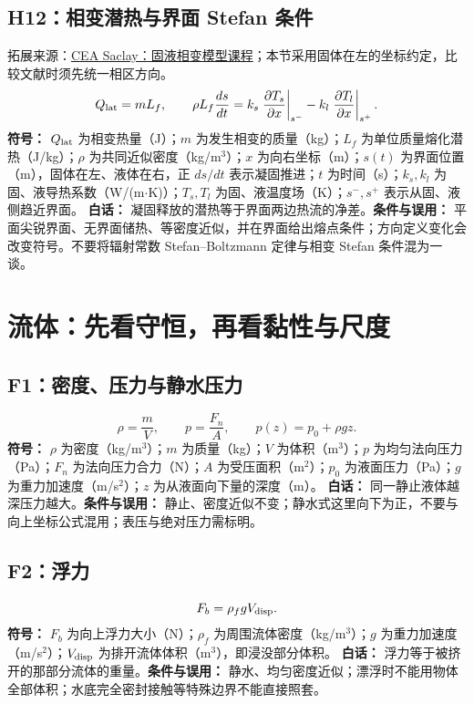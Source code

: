 \documentclass[UTF8,zihao=-4,openany,oneside,fontset=windows]{ctexbook}
\begin{document}
\subsection{H12：相变潜热与界面 Stefan 条件}
拓展来源：\href{https://cea-lbm-saclay.github.io/LBM_Saclay_Documentation/src_doc/05_COURSES/Thermo-PhaseTransition/Phase_Change_Models.html}{CEA Saclay：固液相变模型课程}；本节采用固体在左的坐标约定，比较文献时须先统一相区方向。
\begin{equation}
Q_{\rm lat}=mL_f,\qquad \rho L_f\frac{ds}{dt}=k_s\left.\frac{\partial T_s}{\partial x}\right|_{s^-}-k_l\left.\frac{\partial T_l}{\partial x}\right|_{s^+}.
\end{equation}
\textbf{符号：} $Q_{\rm lat}$ 为相变热量（J）；$m$ 为发生相变的质量（kg）；$L_f$ 为单位质量熔化潜热（J/kg）；$\rho$ 为共同近似密度（kg/m$^3$）；$x$ 为向右坐标（m）；$s(t)$ 为界面位置（m），固体在左、液体在右，正 $ds/dt$ 表示凝固推进；$t$ 为时间（s）；$k_s,k_l$ 为固、液导热系数（W/(m$\cdot$K)）；$T_s,T_l$ 为固、液温度场（K）；$s^-,s^+$ 表示从固、液侧趋近界面。
\textbf{白话：} 凝固释放的潜热等于界面两边热流的净差。\textbf{条件与误用：} 平面尖锐界面、无界面储热、等密度近似，并在界面给出熔点条件；方向定义变化会改变符号。不要将辐射常数 Stefan--Boltzmann 定律与相变 Stefan 条件混为一谈。

\section{流体：先看守恒，再看黏性与尺度}
\subsection{F1：密度、压力与静水压力}
\begin{equation}
\rho=\frac mV,\qquad p=\frac{F_n}{A},\qquad p(z)=p_0+\rho gz.
\end{equation}
\textbf{符号：} $\rho$ 为密度（kg/m$^3$）；$m$ 为质量（kg）；$V$ 为体积（m$^3$）；$p$ 为均匀法向压力（Pa）；$F_n$ 为法向压力合力（N）；$A$ 为受压面积（m$^2$）；$p_0$ 为液面压力（Pa）；$g$ 为重力加速度（m/s$^2$）；$z$ 为从液面向下量的深度（m）。
\textbf{白话：} 同一静止液体越深压力越大。\textbf{条件与误用：} 静止、密度近似不变；静水式这里向下为正，不要与向上坐标公式混用；表压与绝对压力需标明。

\subsection{F2：浮力}
\begin{equation}
F_b=\rho_f gV_{\rm disp}.
\end{equation}
\textbf{符号：} $F_b$ 为向上浮力大小（N）；$\rho_f$ 为周围流体密度（kg/m$^3$）；$g$ 为重力加速度（m/s$^2$）；$V_{\rm disp}$ 为排开流体体积（m$^3$），即浸没部分体积。
\textbf{白话：} 浮力等于被挤开的那部分流体的重量。\textbf{条件与误用：} 静水、均匀密度近似；漂浮时不能用物体全部体积；水底完全密封接触等特殊边界不能直接照套。
\end{document}
